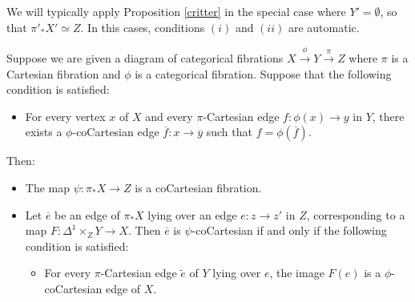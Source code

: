 We will typically apply Proposition \ref{critter} in the special case where $Y' = \emptyset$, so that
$\pi'_{\ast} X' \simeq Z$. In this cases, conditions $(i)$ and $(ii)$ are automatic.

\begin{proposition}\label{sabre1}
Suppose we are given a diagram of categorical fibrations $X \stackrel{\phi}{\rightarrow} Y \stackrel{\pi}{\rightarrow} Z$ where $\pi$ is a Cartesian fibration and $\phi$ is a categorical fibration. Suppose that the following condition is satisfied:
\begin{itemize}
\item[$(\ast)$] For every vertex $x$ of $X$ and every $\pi$-Cartesian edge $f: \phi(x) \rightarrow y$ in $Y$, there exists a $\phi$-coCartesian edge $\overline{f}: x \rightarrow \overline{y}$ such
that $f = \phi( \overline{f} )$. 
\end{itemize}
Then:
\begin{itemize}
\item[$(1)$] The map $\psi: \pi_{\ast} X \rightarrow Z$ is a coCartesian fibration.
\item[$(2)$] Let $\overline{e}$ be an edge of $\pi_{\ast} X$ lying over an edge $e: z \rightarrow z'$ in
$Z$, corresponding to a map $F: \Delta^1 \times_{Z} Y \rightarrow X$. Then $\overline{e}$ is $\psi$-coCartesian if and only if the following condition is satisfied:
\begin{itemize}
\item[$(a)$] For every $\pi$-Cartesian edge $\widetilde{e}$ of $Y$ lying over $e$, the image
$F(e)$ is a $\phi$-coCartesian edge of $X$.
\end{itemize}
\end{itemize}
\end{proposition}

